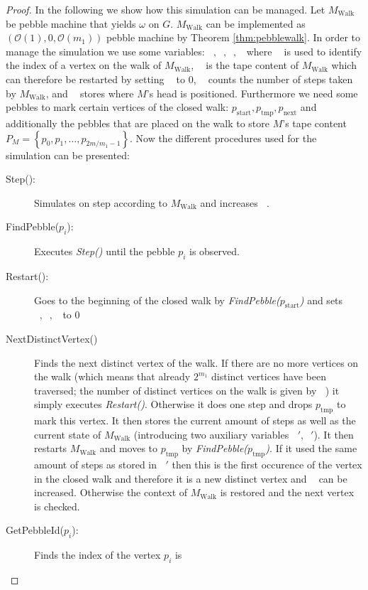 \documentclass[draft,oneside]{scrartcl}
\DeclareMathOperator{\Tid}{T_{\text{id}}}
\DeclareMathOperator{\Tsteps}{T_{\text{steps}}}
\DeclareMathOperator{\Twalk}{T_{\text{walk}}}
\DeclareMathOperator{\Thead}{T_{\text{head}}}
\begin{document}
\begin{proof}
  In the following we show how this simulation can be managed.
  Let $M_{\text{Walk}}$ be pebble machine that yields $\omega$ on $G$.
  $M_{\text{Walk}}$ can be implemented as $(\mathcal{O}(1),0,\mathcal{O}(m_{1}))$
  pebble machine by Theorem \ref{thm:pebblewalk}.
  In order to manage the simulation we use some
  variables: $\Tid, \Tsteps, \Twalk, \Thead$ where $\Tid$ is used to identify
  the index of a vertex on the walk of $M_{\text{Walk}}$, $\Twalk$ is the tape
  content of $M_{\text{Walk}}$ which can therefore be restarted by setting
  $\Twalk$ to 0, $\Tsteps$ counts the number of steps taken by
  $M_{\text{Walk}}$, and $\Thead$ stores where $M$'s head is positioned.
  Furthermore we need some pebbles to mark certain vertices of the closed walk:
  $p_{\text{start}}, p_{\text{tmp}}, p_{\text{next}}$ and additionally the
  pebbles that are placed on the walk to store $M$'s tape content
  $P_{M} = \left\{p_{0},p_{1},\dots,p_{2m/m_{1}-1}\right\}$.
  Now the different procedures used for the simulation can be presented:
  \begin{description}
    \item[Step():] Simulates on step according to $M_{\text{Walk}}$ and
      increases $\Tsteps$.
    \item[FindPebble($p_{i}$):] Executes \emph{Step()} until the pebble $p_{i}$
      is observed.
    \item[Restart():] Goes to the beginning of the closed walk by
      \emph{FindPebble($p_{\text{start}}$)} and sets $\Tsteps,\Tid,\Twalk$ to 0
    \item[NextDistinctVertex()] Finds the next distinct vertex of the walk. If
      there are no more vertices on the walk (which means that already
      $2^{m_1}$ distinct vertices have been traversed; the number of distinct
      vertices on the walk is given by $\Tid$) it simply executes
      \emph{Restart()}. Otherwise it does one step and drops $p_{\text{tmp}}$
      to mark this vertex. It then stores the current amount of steps as well
      as the current state of $M_{\text{Walk}}$ (introducing two auxiliary
      variables $\Tsteps',\Twalk'$). It then restarts $M_{\text{Walk}}$ and
      moves to $p_{\text{tmp}}$ by \emph{FindPebble($p_{\text{tmp}}$)}. If
      it used the same amount of steps as stored in $\Tsteps'$ then this is the
      first occurence of the vertex in the closed walk and therefore it is a
      new distinct vertex and $\Tid$ can be increased. Otherwise the context of
      $M_{\text{Walk}}$ is restored and the next vertex is checked.
    \item[GetPebbleId($p_{i}$):] Finds the index of the vertex $p_{i}$ is

\end{description}
\end{proof}
\end{document}

